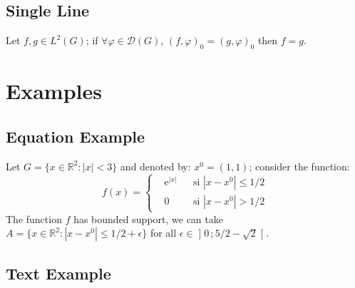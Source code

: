 \documentclass[
	11pt, %
	fleqn, %
	a4paper, %
]{LegrandOrangeBook}
\begin{document}
\subsection{Single Line}

\begin{proposition} %
	Let $f,g\in L^2(G)$; if $\forall \varphi\in\mathcal{D}(G)$, $(f,\varphi)_0=(g,\varphi)_0$ then $f = g$.
\end{proposition}


\section{Examples}

\subsection{Equation Example}

\begin{example} %
	Let $G=\{x\in\mathbb{R}^2:|x|<3\}$ and denoted by: $x^0=(1,1)$; consider the function:
	\begin{equation}
		f(x)=\left\{\begin{aligned}                                                                                                                                                                                                                     & \mathrm{e}^{|x|} &  & \text{si $|x-x^0|\leq 1/2$} \\
                                                                                                                                                                                                                                    & 0                &  & \text{si $|x-x^0|> 1/2$}\end{aligned}\right.
	\end{equation}
	The function $f$ has bounded support, we can take $A=\{x\in\mathbb{R}^2:|x-x^0|\leq 1/2+\epsilon\}$ for all $\epsilon\in\mathopen{]}0\,;5/2-\sqrt{2}\mathclose{[}$.
\end{example}

\subsection{Text Example}
\end{document}
